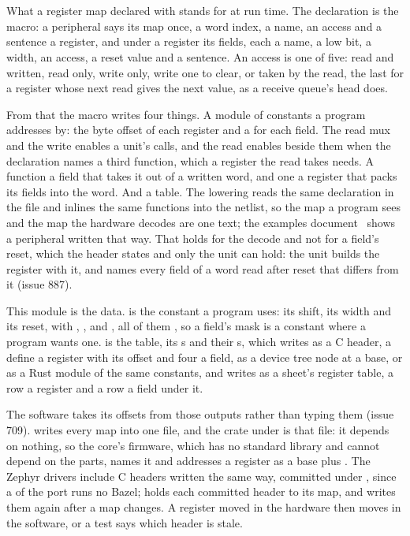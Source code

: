 \section{}
\label{sec:r-regmap}

What a register map declared with  stands for at run
time. The declaration is the macro: a peripheral says its map once, a
word index, a name, an access and a sentence a register, and under a
register its fields, each a name, a low bit, a width, an access, a
reset value and a sentence. An access is one of five: read and
written, read only, write only, write one to clear, or taken by the
read, the last for a register whose next read gives the next value,
as a receive queue's head does.

From that the macro writes four things. A module of constants a
program addresses by: the byte offset of each register and a
 for each field. The read mux and the write enables a
unit's  calls, and the read enables beside them when the
declaration names a third function, which a register the read takes
needs. A function a field that takes it out of a written word, and
one a register that packs its fields into the word. And a table.
The lowering reads the same declaration in the file and inlines the
same functions into the netlist, so the map a program sees
and the map the hardware decodes are one text; the examples
document~\cite{examples} shows a peripheral written that way.
That holds for the decode and not for a field's reset, which the
header states and only the unit can hold: the unit builds the
register with it, and  names every field
of a word read after reset that differs from it (issue 887).

This module is the data.  is the constant a program uses:
its shift, its width and its reset, with , ,
 and , all of them , so a field's
mask is a constant where a program wants one.  is the
table, its s and their s, which
 writes as a C header, a define a register with
its offset and four a field, as a device tree node at a base, or as a
Rust module of the same constants, and 
writes as a sheet's register table, a row a register and a row a
field under it.

The software takes its offsets from those outputs rather than typing
them (issue 709).  writes every map into one file,
and the crate  under
 is that file: it depends on nothing, so
the core's firmware, which has no standard library and cannot depend
on the parts, names it and addresses a register as a base plus
. The Zephyr drivers include C
headers written the same way, committed under
, since a  of the
port runs no Bazel;  holds each committed
header to its map, and  writes
them again after a map changes. A register moved in the hardware then
moves in the software, or a test says which header is stale.


